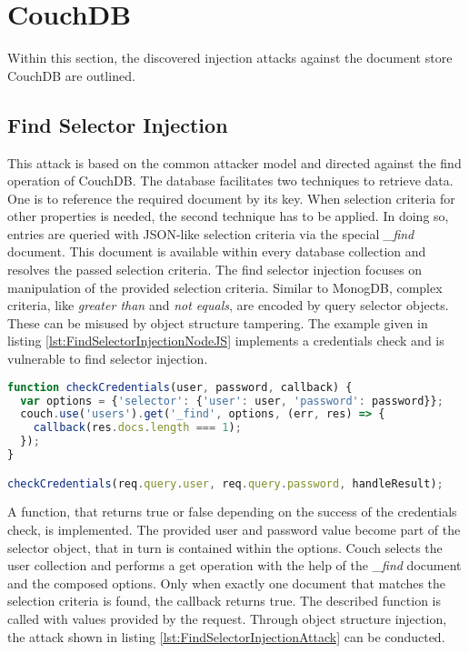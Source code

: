 \section{CouchDB}
Within this section, the discovered injection attacks against the document store CouchDB are outlined.

\subsection{Find Selector Injection}
This attack is based on the common attacker model and directed against the find operation of CouchDB. The database facilitates two techniques to retrieve data. One is to reference the required document by its key. When selection criteria for other properties is needed, the second technique has to be applied. In doing so, entries are queried with JSON-like selection criteria via the special \emph{\_find} document. This document is available within every database collection and resolves the passed selection criteria. The find selector injection focuses on manipulation of the provided selection criteria. Similar to MonogDB, complex criteria, like \emph{greater than} and \emph{not equals}, are encoded by query selector objects. These can be misused by object structure tampering. The example given in listing \ref{lst:FindSelectorInjectionNodeJS} implements a credentials check and is vulnerable to find selector injection. \\

\begin{lstlisting}[caption={Vulnerable NodeJS example for find selector injection against CouchDB}, label={lst:FindSelectorInjectionNodeJS}, language=JavaScript]
function checkCredentials(user, password, callback) {
  var options = {'selector': {'user': user, 'password': password}};
  couch.use('users').get('_find', options, (err, res) => {
    callback(res.docs.length === 1);
  });
}

checkCredentials(req.query.user, req.query.password, handleResult);
\end{lstlisting}

A function, that returns true or false depending on the success of the credentials check, is implemented. The provided user and password value become part of the selector object, that in turn is contained within the options. Couch selects the user collection and performs a get operation with the help of the \emph{\_find} document and the composed options. Only when exactly one document that matches the selection criteria is found, the callback returns true. The described function is called with values provided by the request. Through object structure injection, the attack shown in listing \ref{lst:FindSelectorInjectionAttack} can be conducted. \\

